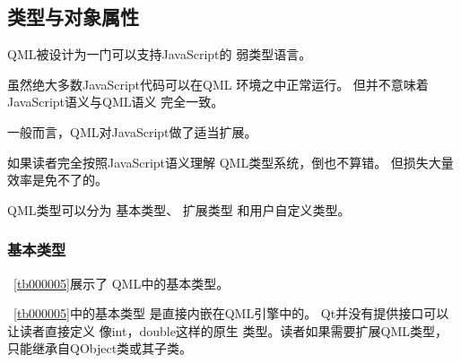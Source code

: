 ﻿




\FloatBarrier
\subsection{
类型与对象属性
}\label{c000011s000000s01}


QML被设计为一门可以支持JavaScript的
弱类型语言。

虽然绝大多数JavaScript代码可以在QML
环境之中正常运行。
但并不意味着JavaScript语义与QML语义
完全一致。

一般而言，QML对JavaScript做了适当扩展。

如果读者完全按照JavaScript语义理解
QML类型系统，倒也不算错。
但损失大量效率是免不了的。

QML类型可以分为
基本类型、
扩展类型
和用户自定义类型。



\FloatBarrier
\subsubsection{
基本类型
}\label{c000011s000000s01s01}



\tablename\ \ref{tb000005}展示了
QML中的基本类型。



\tablename\ \ref{tb000005}中的基本类型
是直接内嵌在QML引擎中的。
Qt并没有提供接口可以让读者直接定义
像int，double这样的原生
类型。读者如果需要扩展QML类型，只能继承自QObject类或其子类。





